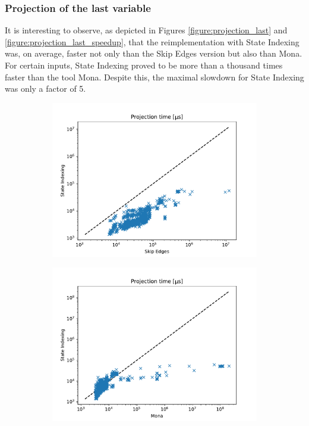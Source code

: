 \documentclass[pdflatex,sn-mathphys-num]{sn-jnl}%
\theoremstyle{thmstyleone}%
\theoremstyle{thmstyletwo}%
\theoremstyle{thmstylethree}%
\begin{document}
        \subsubsection*{Projection of the last variable}
            It is interesting to observe, as depicted in Figures \ref{figure:projection_last} and \ref{figure:projection_last_speedup}, that the reimplementation with State Indexing was, on average, faster not only than the Skip Edges version but also than Mona. For certain inputs, State Indexing proved to be more than a thousand times faster than the tool Mona. Despite this, the maximal slowdown for State Indexing was only a factor of 5.
            \begin{figure}[h!]
                \centering
                \captionsetup[subfigure]{justification=centering}
                \begin{subfigure}{0.49\textwidth}
                    \includegraphics[width=\textwidth]{Figures/projection-last-mata.pdf}
                \end{subfigure}
                \begin{subfigure}{0.49\textwidth}
                    \includegraphics[width=\textwidth]{Figures/projection-last-mona.pdf}

\end{subfigure}
\end{figure}
\end{document}
